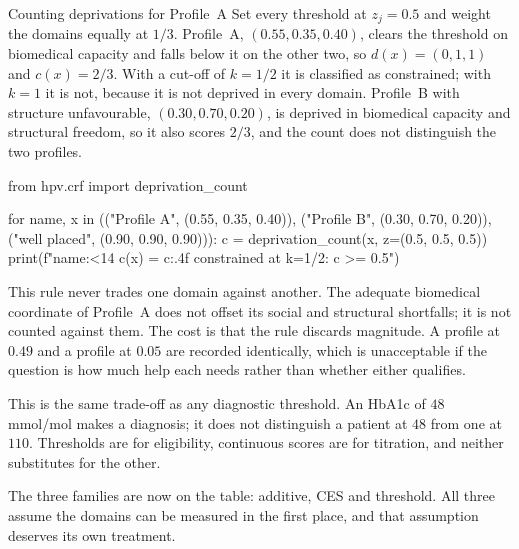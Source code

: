 \begin{workedexample}{Counting deprivations for Profile~A}
Set every threshold at $z_j=0.5$ and weight the domains equally at $1/3$.
Profile~A, $(0.55,0.35,0.40)$, clears the threshold on biomedical capacity and
falls below it on the other two, so $d(x)=(0,1,1)$ and $c(x)=2/3$. With a
cut-off of $k=1/2$ it is classified as constrained; with $k=1$ it is not,
because it is not deprived in every domain. Profile~B with structure
unfavourable, $(0.30,0.70,0.20)$, is deprived in biomedical capacity and
structural freedom, so it also scores $2/3$, and the count does not distinguish
the two profiles.

\begin{wecode}[Python]
from hpv.crf import deprivation_count

for name, x in (("Profile A", (0.55, 0.35, 0.40)),
                ("Profile B", (0.30, 0.70, 0.20)),
                ("well placed", (0.90, 0.90, 0.90))):
    c = deprivation_count(x, z=(0.5, 0.5, 0.5))
    print(f"{name:<14} c(x) = {c:.4f}   constrained at k=1/2: {c >= 0.5}")
\end{wecode}

\end{workedexample}

\begin{reading}
This rule never trades one domain against another. The adequate biomedical
coordinate of Profile~A does not offset its social and structural shortfalls;
it is not counted against them. The cost is that the rule discards magnitude. A
profile at $0.49$ and a profile at $0.05$ are recorded identically, which is unacceptable if the
question is how much help each needs rather than whether either qualifies.

This is the same trade-off as any diagnostic threshold. An HbA1c of $48$
mmol/mol makes a diagnosis; it does not distinguish a patient at $48$ from one
at $110$. Thresholds are for eligibility, continuous scores are for
titration, and neither substitutes for the other.
\end{reading}

The three families are now on the table: additive, CES and threshold. All three
assume the domains can be measured in the first place, and that assumption
deserves its own treatment.

